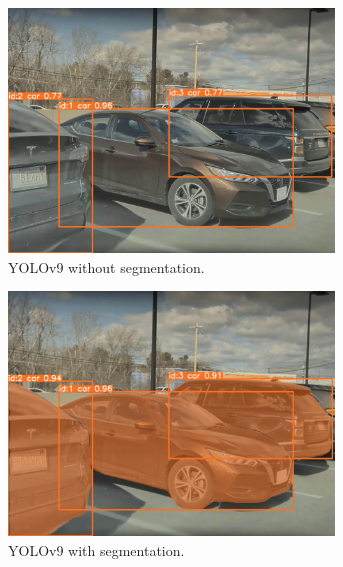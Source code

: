 \begin{figure}
  \centering
  \begin{subfigure}{0.9\linewidth}
    \centering
    \includegraphics[width=0.95\textwidth]{images/YOLOv9_without_seg.jpg}
    \caption{YOLOv9 without segmentation.}
  \end{subfigure}
  \begin{subfigure}{0.9\linewidth}
    \centering
    \includegraphics[width=0.95\textwidth]{images/YOLOv9_with_seg.jpg}
    \caption{YOLOv9 with segmentation.}
  \end{subfigure}
  \begin{subfigure}{0.9\linewidth}
    \centering

\end{subfigure}
\end{figure}
